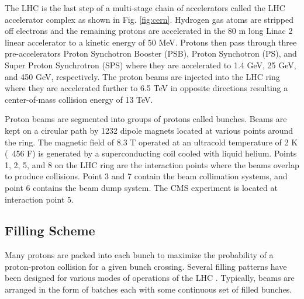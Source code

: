 


The LHC is the last step of a multi-stage chain of accelerators called the LHC accelerator complex as shown in Fig. \ref{fig:cern}. Hydrogen gas atoms are stripped off electrons and the remaining protons are accelerated in the 80 m long Linac 2 linear accelerator to a kinetic energy of 50 MeV. Protons then pass through three pre-accelerators Proton Synchotron Booster (PSB), Proton Synchotron (PS), and Super Proton Synchrotron (SPS) where they are accelerated to 1.4 GeV, 25 GeV, and 450 GeV, respectively. The proton beams are injected into the LHC ring where they are accelerated further to 6.5 TeV in opposite directions resulting a center-of-mass collision energy of 13 TeV.


Proton beams are segmented into groups of protons called bunches. Beams are kept on a circular path by 1232 dipole magnets located at various points around the ring. The magnetic field of 8.3 T operated at an ultracold temperature of  2 K (~456 F) is generated by a superconducting coil cooled with liquid helium. Points 1, 2, 5, and 8 on the LHC ring are the interaction points where the beams overlap to produce collisions. Point 3 and 7 contain the beam collimation systems, and point 6 contains the beam dump system. The CMS experiment is located at interaction point 5.

\subsection{Filling Scheme} \label{sec:fillScheme}

Many protons are packed into each bunch to maximize the probability of a proton-proton collision for a given bunch crossing. Several filling patterns have been designed for various modes of operations of the LHC \cite{fill-schemes}. Typically, beams are arranged in the form of batches each with some continuous set of filled bunches. 

